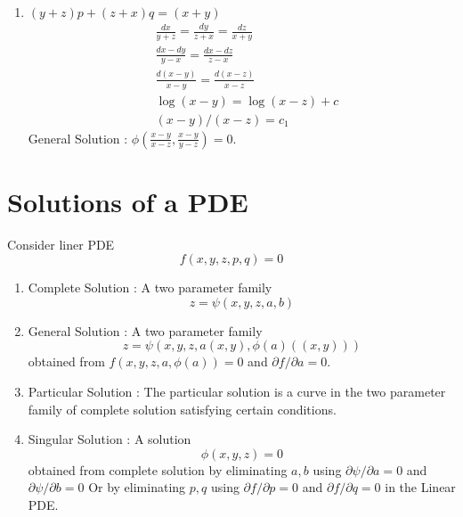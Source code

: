 \begin{enumerate}
\begin{align*}
			& \frac{dx-dy}{(x-y)(x+y+z)} = \frac{dy-dz}{(y-z)(y+z+x)}\\
			& \frac{d(x-y)}{x-y} = \frac{d(y-z)}{y-z} \\
			& \log (x-y) - \log (y-z) + c\\
			& (x-y)/(y-z) = c_1
			\intertext{Similarly,}
			& (x-z)/(y-z) = c_2
		\end{align*}
		General Solution : $\phi\left(\frac{x-y}{y-z},\frac{x-z}{y-z}\right) = 0$.
	\item $(y+z)p + (z+x)q = (x+y)$
		\begin{align*}
			& \frac{dx}{y+z} = \frac{dy}{z+x} = \frac{dz}{x+y} \\
			& \frac{dx-dy}{y-x} = \frac{dx-dz}{z-x} \\
			& \frac{d(x-y)}{x-y} = \frac{d(x-z)}{x-z} \\
			& \log (x-y) = \log (x-z) + c \\
			& (x-y)/(x-z) = c_1
		\end{align*}
		General Solution : $\phi\left(\frac{x-y}{x-z}, \frac{x-y}{y-z}\right) = 0$.
\end{enumerate}

\section{Solutions of a PDE}
Consider liner PDE \begin{equation} f(x,y,z,p,q) = 0 \end{equation}
\begin{enumerate}
	\item Complete Solution :
		A two parameter family \begin{equation}z = \psi(x,y,z,a,b) \end{equation}
	\item General Solution :
		A two parameter family \begin{equation}z = \psi(x,y,z,a(x,y),\phi(a)((x,y))) \end{equation} obtained from $f(x,y,z,a, \phi(a)) = 0$ and $\partial f/\partial a = 0$.
	\item Particular Solution :
		The particular solution is a curve in the two parameter family of complete solution satisfying certain conditions.
	\item Singular Solution : A solution \begin{equation}\phi(x,y,z) = 0\end{equation} obtained from complete solution by eliminating $a,b$ using $\partial \psi/\partial a = 0$ and $\partial \psi/\partial b = 0$ Or by eliminating $p,q$ using $\partial f/\partial p = 0$ and $\partial f/\partial q = 0$ in the Linear PDE.
\end{enumerate}
		
